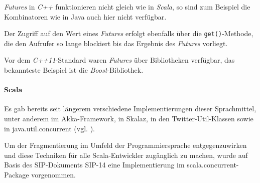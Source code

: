 \emph{Futures} in \emph{C++} funktionieren nicht gleich wie in
\emph{Scala}, so sind zum Beispiel die Kombinatoren wie in Java auch 
hier nicht verfügbar.

Der Zugriff auf den Wert eines \emph{Futures} erfolgt ebenfalls über die
\texttt{get()}-Methode, die den Aufrufer so lange blockiert bis
das Ergebnis des \emph{Futures} vorliegt.

Vor dem \emph{C++11}-Standard waren \emph{Futures} über Bibliotheken
verfügbar, das bekannteste Beispiel ist die \emph{Boost}-Bibliothek.

\paragraph{Scala} Es gab bereits seit längerem verschiedene 
Implementierungen dieser Sprachmittel,
unter anderem im Akka-Framework, in Skalaz, in den Twitter-Util-Klassen sowie
in java.util.concurrent (vgl. \cite{futuresTry}).

Um der Fragmentierung im Umfeld der Programmiersprache entgegenzuwirken und
diese Techniken für alle Scala-Entwickler zugänglich zu machen, wurde auf Basis
des SIP-Dokuments SIP-14 eine Implementierung im scala.concurrent-Package
vorgenommen.
